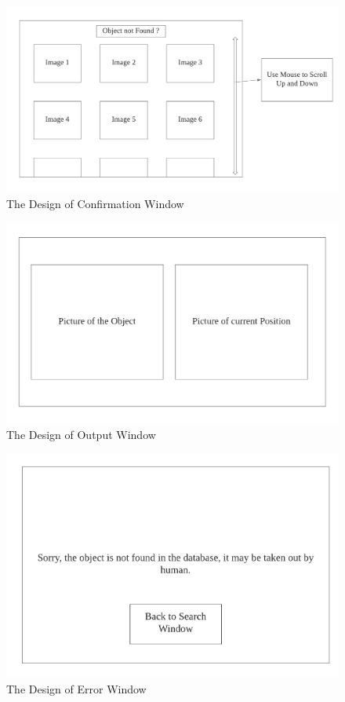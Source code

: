 \documentclass[12pt, titlepage]{article}
\begin{document}
\begin{figure}[H]
    \centering
    \includegraphics[scale=0.6]{Confirmation.png}
    \caption{The Design of Confirmation Window}
\end{figure}

\begin{figure}[H]
    \centering
    \includegraphics[scale=0.6]{Output.png}
    \caption{The Design of Output Window}
\end{figure}

\begin{figure}[H]
    \centering
    \includegraphics[scale=0.6]{Error.png}
    \caption{The Design of Error Window}
\end{figure}
\end{document}
